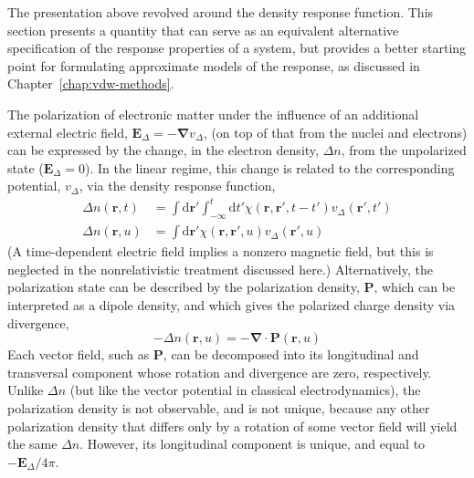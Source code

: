 The presentation above revolved around the density response function.
This section presents a quantity that can serve as an equivalent alternative specification of the response properties of a system, but provides a better starting point for formulating approximate models of the response, as discussed in Chapter~\ref{chap:vdw-methods}.

The polarization of electronic matter under the influence of an additional external electric field, $\mathbf E_\Delta=-\boldsymbol\nabla v_\Delta$, (on top of that from the nuclei and electrons) can be expressed by the change, in the electron density, $\Delta n$, from the unpolarized state ($\mathbf E_\Delta=0$).
In the linear regime, this change is related to the corresponding potential, $v_\Delta$, via the density response function,
\begin{align}
  \Delta n(\mathbf r,t)&=\int\mathrm d\mathbf r'\int_{-\infty}^t\mathrm dt'\chi(\mathbf r,\mathbf r',t-t')v_\Delta(\mathbf r',t') \\
  \Delta n(\mathbf r,u)&=\int\mathrm d\mathbf r'\chi(\mathbf r,\mathbf r',u)v_\Delta(\mathbf r',u)
  \label{eq:polarization}
\end{align}
(A time-dependent electric field implies a nonzero magnetic field, but this is neglected in the nonrelativistic treatment discussed here.)
Alternatively, the polarization state can be described by the polarization density, $\mathbf P$, which can be interpreted as a dipole density, and which gives the polarized charge density via divergence,
\begin{equation}
  -\Delta n(\mathbf r,u)=-\boldsymbol\nabla\cdot\mathbf P(\mathbf r,u)
\end{equation}
Each vector field, such as $\mathbf P$, can be decomposed into its longitudinal and transversal component whose rotation and divergence are zero, respectively.
Unlike $\Delta n$ (but like the vector potential in classical electrodynamics), the polarization density is not observable, and is not unique, because any other polarization density that differs only by a rotation of some vector field will yield the same $\Delta n$.
However, its longitudinal component is unique, and equal to $-\mathbf E_\Delta/4\pi$.

